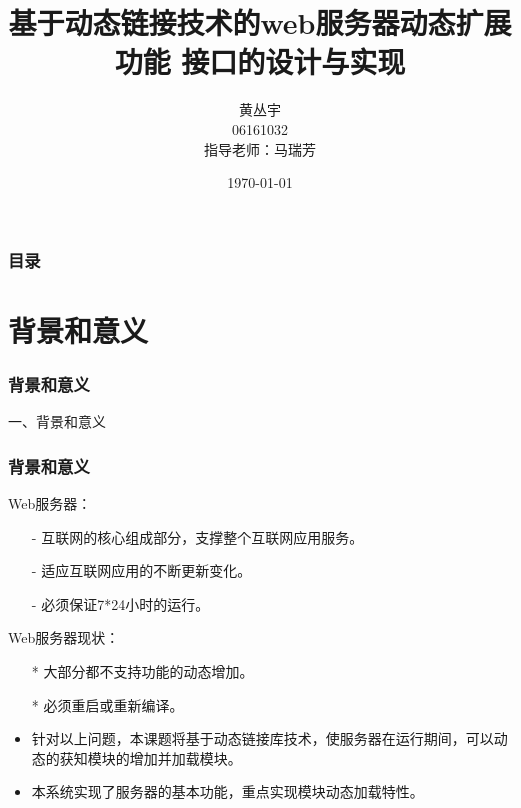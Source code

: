 \documentclass[10pt,dvipdfm]{beamer}
\begin{document}
\title[毕业设计答辩]{\LARGE{
			基于动态链接技术的web服务器动态扩展功能
				接口的设计与实现
	}}
\author[黄丛宇]{黄丛宇\\06161032\\指导老师：马瑞芳}
\date{\today}

\begin{frame}	
	\titlepage
\end{frame}

\begin{frame}
	\frametitle{目录}
	\tableofcontents
\end{frame}

\section{背景和意义}

\begin{frame}
	\frametitle{背景和意义}
	\begin{center}
	{\Large
		一、背景和意义
	}
	\end{center}
\end{frame}

\begin{frame}
	\frametitle{背景和意义}
	\begin{block}{Web服务器：}
		\begin{itemize}
			\item[-] 互联网的核心组成部分，支撑整个互联网应用服务。
			\item[-] 适应互联网应用的不断更新变化。
			\item[-] 必须保证7*24小时的运行。
		\end{itemize}
	\end{block}
	
	\pause
	
	\begin{block}{Web服务器现状：}
		\begin{itemize}
			\item[*] 大部分都不支持功能的动态增加。
			\item[*] 必须重启或重新编译。
		\end{itemize}
	\end{block}
	\pause
	\begin{block}{}
	\begin{itemize}
		\item 针对以上问题，本课题将基于动态链接库技术，使服务器在运行期间，可以动态的获知模块的增加并加载模块。
		\item 本系统实现了服务器的基本功能，重点实现模块动态加载特性。
	\end{itemize}
	\end{block}
\end{frame}
\end{document}
